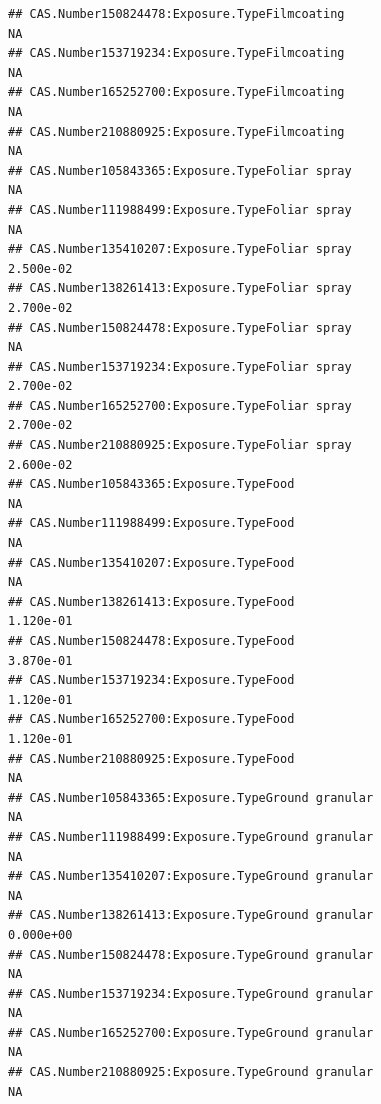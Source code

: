 \documentclass[
  12pt,
]{article}
\begin{document}
\begin{verbatim}
## CAS.Number150824478:Exposure.TypeFilmcoating                                            NA
## CAS.Number153719234:Exposure.TypeFilmcoating                                            NA
## CAS.Number165252700:Exposure.TypeFilmcoating                                            NA
## CAS.Number210880925:Exposure.TypeFilmcoating                                            NA
## CAS.Number105843365:Exposure.TypeFoliar spray                                           NA
## CAS.Number111988499:Exposure.TypeFoliar spray                                           NA
## CAS.Number135410207:Exposure.TypeFoliar spray                                    2.500e-02
## CAS.Number138261413:Exposure.TypeFoliar spray                                    2.700e-02
## CAS.Number150824478:Exposure.TypeFoliar spray                                           NA
## CAS.Number153719234:Exposure.TypeFoliar spray                                    2.700e-02
## CAS.Number165252700:Exposure.TypeFoliar spray                                    2.700e-02
## CAS.Number210880925:Exposure.TypeFoliar spray                                    2.600e-02
## CAS.Number105843365:Exposure.TypeFood                                                   NA
## CAS.Number111988499:Exposure.TypeFood                                                   NA
## CAS.Number135410207:Exposure.TypeFood                                                   NA
## CAS.Number138261413:Exposure.TypeFood                                            1.120e-01
## CAS.Number150824478:Exposure.TypeFood                                            3.870e-01
## CAS.Number153719234:Exposure.TypeFood                                            1.120e-01
## CAS.Number165252700:Exposure.TypeFood                                            1.120e-01
## CAS.Number210880925:Exposure.TypeFood                                                   NA
## CAS.Number105843365:Exposure.TypeGround granular                                        NA
## CAS.Number111988499:Exposure.TypeGround granular                                        NA
## CAS.Number135410207:Exposure.TypeGround granular                                        NA
## CAS.Number138261413:Exposure.TypeGround granular                                 0.000e+00
## CAS.Number150824478:Exposure.TypeGround granular                                        NA
## CAS.Number153719234:Exposure.TypeGround granular                                        NA
## CAS.Number165252700:Exposure.TypeGround granular                                        NA
## CAS.Number210880925:Exposure.TypeGround granular                                        NA

\end{verbatim}
\end{document}
